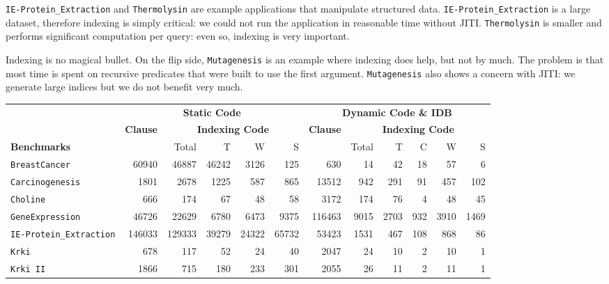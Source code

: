 \documentclass{llncs}
\begin{document}
\texttt{IE-Protein\_Extraction} and \texttt{Thermolysin} are example
applications that manipulate structured data.
\texttt{IE-Protein\_Extraction} is a large dataset, therefore indexing
is simply critical: we could not run the application in reasonable
time without JITI. \texttt{Thermolysin} is smaller and performs
significant computation per query: even so, indexing is very
important.

Indexing is no magical bullet. On the flip side, \texttt{Mutagenesis}
is an example where indexing does help, but not by much. The problem
is that most time is spent on recursive predicates that were built to
use the first argument. \texttt{Mutagenesis} also shows a concern with
JITI: we generate large indices but we do not benefit very much.

\begin{table*}[ht]
  \centering
  \begin {tabular}{|l|r|r|r|r|r||r|r|r|r|r|r|} \hline %
    &  \multicolumn{5}{|c||}{\bf Static Code}  & \multicolumn{6}{|c|}{\bf Dynamic Code \& IDB} \\
    &  \textbf{Clause} & \multicolumn{4}{|c||}{\bf Indexing Code}  & \textbf{Clause} & \multicolumn{5}{|c|}{\bf Indexing Code} \\
    \textbf{Benchmarks} &   & Total & T & W & S &  & Total & T & C & W & S  \\
    \hline
    \texttt{BreastCancer}      & 60940 & 46887 & 46242 &
    3126 & 125  & 630 & 14 &42 & 18& 57 &6 \\

    \texttt{Carcinogenesis}    & 1801 & 2678
    &1225 & 587 & 865  & 13512 & 942     & 291 & 91 & 457 & 102
 \\

    \texttt{Choline}  & 666 & 174
    &67 & 48 & 58 & 3172 & 174
    & 76 & 4 & 48 & 45
 \\
    \texttt{GeneExpression}    &  46726 & 22629
    &6780 & 6473 & 9375 & 116463 & 9015
    & 2703 & 932 & 3910 & 1469
 \\

    \texttt{IE-Protein\_Extraction}    &146033 & 129333
    &39279 & 24322 & 65732 & 53423 & 1531
    & 467 & 108 & 868 & 86
 \\

    \texttt{Krki}              & 678 & 117
    &52 & 24 & 40 & 2047 & 24
    & 10 & 2 & 10 & 1
 \\

    \texttt{Krki II}           & 1866 & 715
    &180 & 233 & 301 & 2055 & 26
    & 11 & 2 & 11 & 1
 \\


\end{tabular}
\end{table*}
\end{document}
